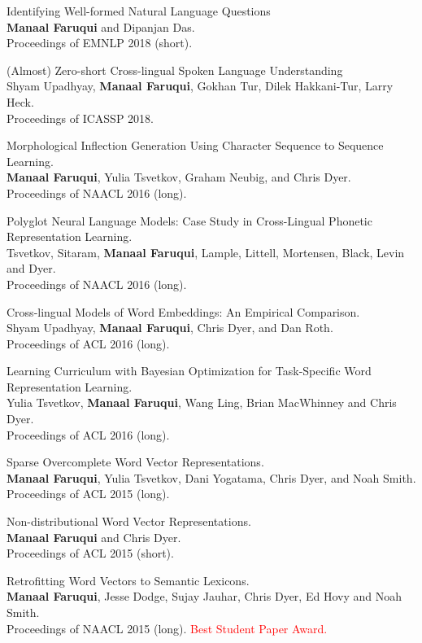 \documentclass[margin,line]{res}
\begin{document}
\begin{resume}
Identifying Well-formed Natural Language Questions\\
\textbf{Manaal Faruqui} and Dipanjan Das.\\
Proceedings of EMNLP 2018 (short).

(Almost) Zero-short Cross-lingual Spoken Language Understanding\\
Shyam Upadhyay, \textbf{Manaal Faruqui}, Gokhan Tur, Dilek Hakkani-Tur, Larry Heck.\\
Proceedings of ICASSP 2018.

Morphological Inflection Generation Using Character Sequence to Sequence Learning.\\
\textbf{Manaal Faruqui}, Yulia Tsvetkov, Graham Neubig, and Chris Dyer.\\
Proceedings of NAACL 2016 (long).

Polyglot Neural Language Models: Case Study in Cross-Lingual Phonetic Representation Learning.\\
Tsvetkov, Sitaram, \textbf{Manaal Faruqui}, Lample, Littell, Mortensen, Black,  Levin and Dyer.\\
Proceedings of NAACL 2016 (long).

Cross-lingual Models of Word Embeddings: An Empirical Comparison.\\
Shyam Upadhyay, \textbf{Manaal Faruqui}, Chris Dyer, and Dan Roth.\\
Proceedings of ACL 2016 (long).

Learning Curriculum with Bayesian Optimization for Task-Specific Word Representation Learning.\\
Yulia Tsvetkov, \textbf{Manaal Faruqui}, Wang Ling, Brian MacWhinney and Chris Dyer.\\
Proceedings of ACL 2016 (long).

Sparse Overcomplete Word Vector Representations.\\
\textbf{Manaal Faruqui}, Yulia Tsvetkov, Dani Yogatama, Chris Dyer, and Noah Smith.\\
Proceedings of ACL 2015 (long).

Non-distributional Word Vector Representations.\\
\textbf{Manaal Faruqui} and Chris Dyer.\\
Proceedings of ACL 2015 (short).

Retrofitting Word Vectors to Semantic Lexicons.\\
\textbf{Manaal Faruqui}, Jesse Dodge, Sujay Jauhar, Chris Dyer, Ed Hovy and Noah Smith.\\
Proceedings of NAACL 2015 (long). \textcolor{red}{Best Student Paper Award.}


\end{resume}
\end{document}
